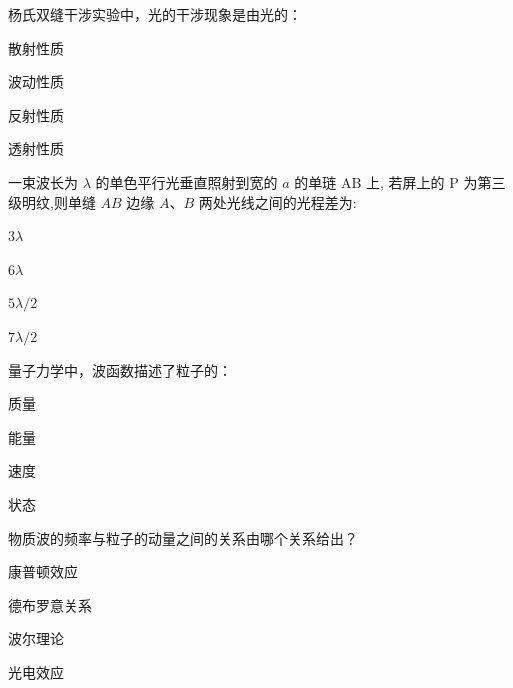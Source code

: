 \documentclass{njustexam}
\begin{document}
    \begin{problem}

    杨氏双缝干涉实验中，光的干涉现象是由光的：
    \begin{abcd}
      \item 散射性质
      \item 波动性质
      \item 反射性质
      \item 透射性质
    \end{abcd}
    \end{problem}



\begin{problem}
一束波长为 $\lambda$ 的单色平行光垂直照射到宽的 $a$ 的单琏 $\mathrm{AB}$ 上, 
    若屏上的 $\mathrm{P}$ 为第三级明纹,则单缝 $A B$ 边缘 $A 、 B$ 两处光线之间的光程差为: 
    \begin{abcd}
      \item $3 \lambda$
      \item $6 \lambda$
      \item $5 \lambda / 2$
      \item $7 \lambda / 2$
    \end{abcd}
\end{problem}
  
    \begin{problem}

      量子力学中，波函数描述了粒子的：
      \begin{abcd}
        \item 质量
        \item 能量
        \item 速度
        \item 状态
      \end{abcd}
      \end{problem}

      \begin{problem}

        物质波的频率与粒子的动量之间的关系由哪个关系给出？
        \begin{abcd}
          \item 康普顿效应
          \item 德布罗意关系
          \item 波尔理论
          \item 光电效应
        \end{abcd}
        \end{problem}
\end{document}
